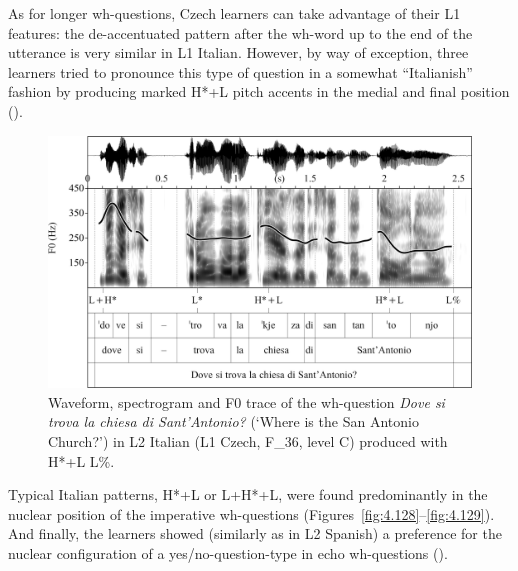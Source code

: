 As for longer wh-questions, Czech learners can take advantage of their L1 features: the de-accentuated pattern after the wh-word up to the end of the utterance is very similar in L1 Italian. However, by way of exception, three learners tried to pronounce this type of question in a somewhat “Italianish” fashion by producing marked H*+L pitch accents in the medial and final position ().

\begin{figure}
\includegraphics[width=\textwidth]{figures/Figure_4.127.png}
\caption{Waveform, spectrogram and F0 trace of the wh-question \textit{Dove si trova la chiesa di Sant’Antonio?} (‘Where is the San Antonio Church?’) in L2 Italian (L1 Czech, F\_36, level C) produced with H*+L L\%.}
\label{fig:4.127}
\end{figure}

Typical Italian patterns, H*+L or L+H*+L, were found predominantly in the nuclear position of the imperative wh-questions (Figures~\ref{fig:4.128}--\ref{fig:4.129}). And finally, the learners showed (similarly as in L2 Spanish) a preference for the nuclear configuration of a yes/no-question-type in echo wh-questions ().

